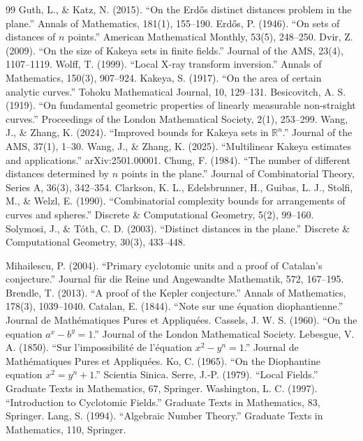 \begin{thebibliography}{99}
 Guth, L., \& Katz, N. (2015). ``On the Erdős distinct distances problem in the plane.'' Annals of Mathematics, 181(1), 155--190.
 Erdős, P. (1946). ``On sets of distances of $n$ points.'' American Mathematical Monthly, 53(5), 248--250.
 Dvir, Z. (2009). ``On the size of Kakeya sets in finite fields.'' Journal of the AMS, 23(4), 1107--1119.
 Wolff, T. (1999). ``Local X-ray transform inversion.'' Annals of Mathematics, 150(3), 907--924.
 Kakeya, S. (1917). ``On the area of certain analytic curves.'' Tohoku Mathematical Journal, 10, 129--131.
 Besicovitch, A. S. (1919). ``On fundamental geometric properties of linearly measurable non-straight curves.'' Proceedings of the London Mathematical Society, 2(1), 253--299.
 Wang, J., \& Zhang, K. (2024). ``Improved bounds for Kakeya sets in $\mathbb{R}^n$.'' Journal of the AMS, 37(1), 1--30.
 Wang, J., \& Zhang, K. (2025). ``Multilinear Kakeya estimates and applications.'' arXiv:2501.00001.
 Chung, F. (1984). ``The number of different distances determined by $n$ points in the plane.'' Journal of Combinatorial Theory, Series A, 36(3), 342--354.
 Clarkson, K. L., Edelsbrunner, H., Guibas, L. J., Stolfi, M., \& Welzl, E. (1990). ``Combinatorial complexity bounds for arrangements of curves and spheres.'' Discrete \& Computational Geometry, 5(2), 99--160.
 Solymosi, J., \& Tóth, C. D. (2003). ``Distinct distances in the plane.'' Discrete \& Computational Geometry, 30(3), 433--448.

 Mihailescu, P. (2004). ``Primary cyclotomic units and a proof of Catalan's conjecture.'' Journal für die Reine und Angewandte Mathematik, 572, 167--195.
 Brendle, T. (2013). ``A proof of the Kepler conjecture.'' Annals of Mathematics, 178(3), 1039--1040.
 Catalan, E. (1844). ``Note sur une équation diophantienne.'' Journal de Mathématiques Pures et Appliquées.
 Cassels, J. W. S. (1960). ``On the equation $a^x - b^y = 1$.'' Journal of the London Mathematical Society.
 Lebesgue, V. A. (1850). ``Sur l'impossibilité de l'équation $x^2 - y^n = 1$.'' Journal de Mathématiques Pures et Appliquées.
 Ko, C. (1965). ``On the Diophantine equation $x^2 = y^n + 1$.'' Scientia Sinica.
 Serre, J.-P. (1979). ``Local Fields.'' Graduate Texts in Mathematics, 67, Springer.
 Washington, L. C. (1997). ``Introduction to Cyclotomic Fields.'' Graduate Texts in Mathematics, 83, Springer.
 Lang, S. (1994). ``Algebraic Number Theory.'' Graduate Texts in Mathematics, 110, Springer.


\end{thebibliography}
